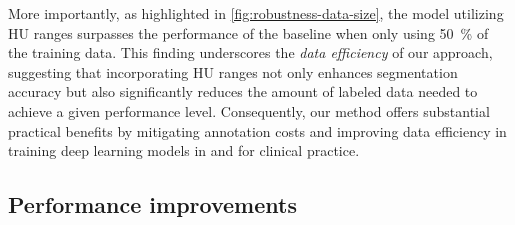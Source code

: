 \documentclass[conference]{IEEEtran}
\begin{document}
More importantly, as highlighted in \cref{fig:robustness-data-size}, the model utilizing HU ranges surpasses the performance of the baseline when only using \SI{50}{\percent} of the training data. This finding underscores the \emph{data efficiency} of our approach, suggesting that incorporating HU ranges not only enhances segmentation accuracy but also significantly reduces the amount of labeled data needed to achieve a given performance level. Consequently, our method offers substantial practical benefits by mitigating annotation costs and improving data efficiency in training deep learning models in and for clinical practice.

\subsection{Performance improvements}
\end{document}
